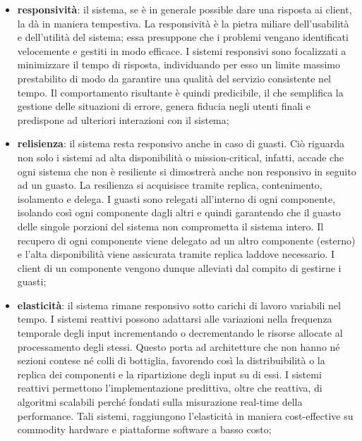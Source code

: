 \documentclass[12pt,a4paper,openright,twoside]{book}
\begin{document}
\begin{itemize}
    \item \textbf{responsività}: il sistema, se è in generale possible dare una risposta ai client, la dà in maniera tempestiva. La responsività è la pietra miliare dell'usabilità e dell'utilità del sistema; essa presuppone che i problemi vengano identificati velocemente e gestiti in modo efficace. I sistemi responsivi sono focalizzati a minimizzare il tempo di risposta, individuando per esso un limite massimo prestabilito di modo da garantire una qualità del servizio consistente nel tempo. Il comportamento risultante è quindi predicibile, il che semplifica la gestione delle situazioni di errore, genera fiducia negli utenti finali e predispone ad ulteriori interazioni con il sistema;
    \item \textbf{relisienza}: il sistema resta responsivo anche in caso di guasti. Ciò riguarda non solo i sistemi ad alta disponibilità o mission-critical, infatti, accade che ogni sistema che non è resiliente si dimostrerà anche non responsivo in seguito ad un guasto. La resilienza si acquisisce tramite replica, contenimento, isolamento e delega. I guasti sono relegati all'interno di ogni componente, isolando così ogni componente dagli altri e quindi garantendo che il guasto delle singole porzioni del sistema non comprometta il sistema intero. Il recupero di ogni componente viene delegato ad un altro componente (esterno) e l'alta disponibilità viene assicurata tramite replica laddove necessario. I client di un componente vengono dunque alleviati dal compito di gestirne i guasti;
    \item \textbf{elasticità}: il sistema rimane responsivo sotto carichi di lavoro variabili nel tempo. I sistemi reattivi possono adattarsi alle variazioni nella frequenza temporale degli input incrementando o decrementando le risorse allocate al processamento degli stessi. Questo porta ad architetture che non hanno né sezioni contese né colli di bottiglia, favorendo così la distribuibilità o la replica dei componenti e la ripartizione degli input su di essi. I sistemi reattivi permettono l'implementazione predittiva, oltre che reattiva, di algoritmi scalabili perché fondati sulla misurazione real-time della performance. Tali sistemi, raggiungono l'elasticità in maniera cost-effective su commodity hardware e piattaforme software a basso costo;

\end{itemize}
\end{document}
